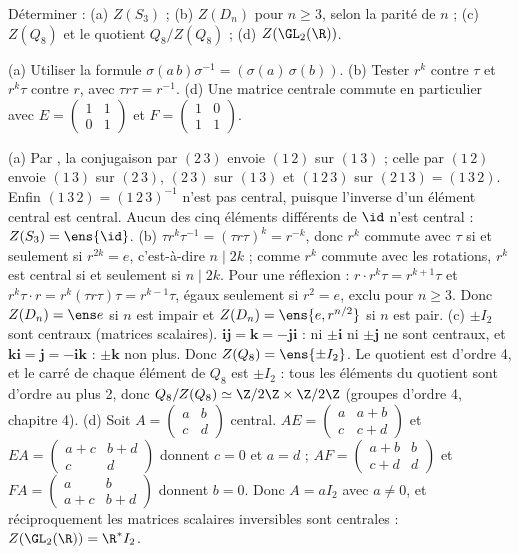 \begin{exo}\label{exo-centres}
Déterminer : (a) $Z(S_3)$ ; (b) $Z(D_n)$ pour $n\ge3$, selon la parité de $n$ ; (c) $Z(Q_8)$ et le quotient $Q_8/Z(Q_8)$ ; (d) $Z(\GL_2(\R))$.
\begin{indication}
(a) Utiliser la formule $\sigma(a\,b)\sigma^{-1}=(\sigma(a)\,\sigma(b))$. (b) Tester $r^k$ contre $\tau$ et $r^k\tau$ contre $r$, avec $\tau r\tau=r^{-1}$. (d) Une matrice centrale commute en particulier avec $E=\begin{pmatrix}1&1\\0&1\end{pmatrix}$ et $F=\begin{pmatrix}1&0\\1&1\end{pmatrix}$.
\end{indication}
\begin{corrige}
(a) Par , la conjugaison par $(2\,3)$ envoie $(1\,2)$ sur $(1\,3)$ ; celle par $(1\,2)$ envoie $(1\,3)$ sur $(2\,3)$, $(2\,3)$ sur $(1\,3)$ et $(1\,2\,3)$ sur $(2\,1\,3)=(1\,3\,2)$. Enfin $(1\,3\,2)=(1\,2\,3)^{-1}$ n'est pas central, puisque l'inverse d'un élément central est central. Aucun des cinq éléments différents de $\id$ n'est central : $Z(S_3)=\ens{\id}$.
(b) $\tau r^k\tau^{-1}=(\tau r\tau)^k=r^{-k}$, donc $r^k$ commute avec $\tau$ si et seulement si $r^{2k}=e$, c'est-à-dire $n\mid2k$ ; comme $r^k$ commute avec les rotations, $r^k$ est central si et seulement si $n\mid 2k$. Pour une réflexion : $r\cdot r^k\tau=r^{k+1}\tau$ et $r^k\tau\cdot r=r^k(\tau r\tau)\tau=r^{k-1}\tau$, égaux seulement si $r^2=e$, exclu pour $n\ge3$. Donc $Z(D_n)=\ens e$ si $n$ est impair et $Z(D_n)=\ens{e,r^{n/2}}$ si $n$ est pair.
(c) $\pm I_2$ sont centraux (matrices scalaires). $\mathbf i\mathbf j=\mathbf k=-\mathbf j\mathbf i$ : ni $\pm\mathbf i$ ni $\pm\mathbf j$ ne sont centraux, et $\mathbf k\mathbf i=\mathbf j=-\mathbf i\mathbf k$ : $\pm\mathbf k$ non plus. Donc $Z(Q_8)=\ens{\pm I_2}$. Le quotient est d'ordre 4, et le carré de chaque élément de $Q_8$ est $\pm I_2$ : tous les éléments du quotient sont d'ordre au plus 2, donc $Q_8/Z(Q_8)\simeq\Z/2\Z\times\Z/2\Z$ (groupes d'ordre 4, chapitre 4).
(d) Soit $A=\begin{pmatrix}a&b\\c&d\end{pmatrix}$ central. $AE=\begin{pmatrix}a&a+b\\c&c+d\end{pmatrix}$ et $EA=\begin{pmatrix}a+c&b+d\\c&d\end{pmatrix}$ donnent $c=0$ et $a=d$ ; $AF=\begin{pmatrix}a+b&b\\c+d&d\end{pmatrix}$ et $FA=\begin{pmatrix}a&b\\a+c&b+d\end{pmatrix}$ donnent $b=0$. Donc $A=aI_2$ avec $a\neq0$, et réciproquement les matrices scalaires inversibles sont centrales : $Z(\GL_2(\R))=\R^*I_2$.

\end{corrige}
\end{exo}
